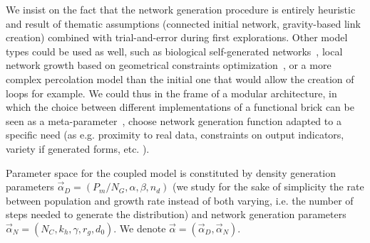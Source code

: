 \documentclass{article}
\begin{document}
We insist on the fact that the network generation procedure is entirely heuristic and result of thematic assumptions (connected initial network, gravity-based link creation) combined with trial-and-error during first explorations. Other model types could be used as well, such as biological self-generated networks~\cite{tero2010rules}, local network growth based on geometrical constraints optimization~\cite{courtat2011mathematics}, or a more complex percolation model than the initial one that would allow the creation of loops for example. We could thus in the frame of a modular architecture, in which the choice between different implementations of a functional brick can be seen as a meta-parameter~\cite{cottineau2015growing}, choose network generation function adapted to a specific need (as e.g. proximity to real data, constraints on output indicators, variety if generated forms, etc. ).




Parameter space for the coupled model is constituted by density generation parameters $\vec{\alpha}_D = (P_m/N_G , \alpha,\beta , n_d)$ (we study for the sake of simplicity the rate between population and growth rate instead of both varying, i.e. the number of steps needed to generate the distribution) and network generation parameters $\vec{\alpha}_N=(N_C,k_h,\gamma , r_g , d_0)$. We denote $\vec{\alpha} = (\vec{\alpha}_D,\vec{\alpha}_N)$. 



\end{document}
